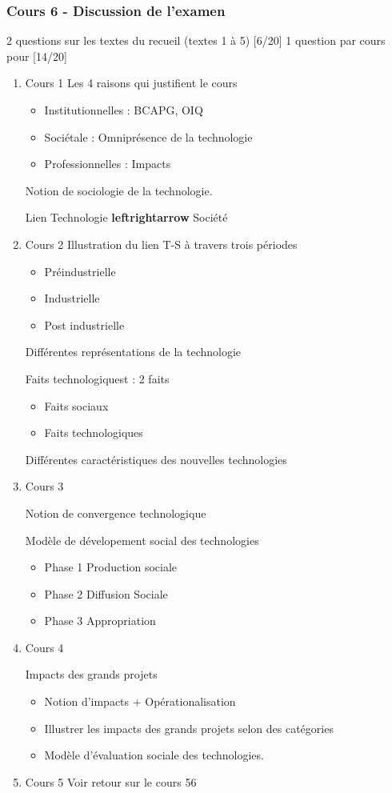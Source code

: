 \documentclass[11pt]{article}
\begin{document}
\subsubsection{Cours 6 - Discussion de l'examen}
\label{sec:org6187d37}
2 questions sur les textes du recueil (textes 1 à 5) [6/20]
1 question par cours pour [14/20]
\begin{enumerate}
\item Cours 1
\label{sec:org8222f47}
Les 4 raisons qui justifient le cours
\begin{itemize}
\item Institutionnelles : BCAPG, OIQ
\item Sociétale : Omniprésence de la technologie
\item Professionnelles : Impacts
\end{itemize}

Notion de sociologie de la technologie.

Lien Technologie \textbf{leftrightarrow} Société
\item Cours 2 Illustration du lien T-S à travers trois périodes
\label{sec:orga96cf0f}
\begin{itemize}
\item Préindustrielle
\item Industrielle
\item Post industrielle
\end{itemize}

Différentes représentations de la technologie

Faits technologiquest : 2 faits
\begin{itemize}
\item Faits sociaux
\item Faits technologiques
\end{itemize}

Différentes caractéristiques des nouvelles technologies

\item Cours 3
\label{sec:org89f7f49}

Notion de convergence technologique

Modèle de dévelopement social des technologies
\begin{itemize}
\item Phase 1 Production sociale
\item Phase 2 Diffusion Sociale
\item Phase 3 Appropriation
\end{itemize}

\item Cours 4
\label{sec:org5678649}

Impacts des grands projets
\begin{itemize}
\item Notion d'impacts + Opérationalisation
\item Illustrer les impacts des grands projets selon des catégories
\item Modèle d'évaluation sociale des technologies.
\end{itemize}

\item Cours 5
\label{sec:org69edd21}
Voir retour sur le cours 56
\end{enumerate}
\end{document}
